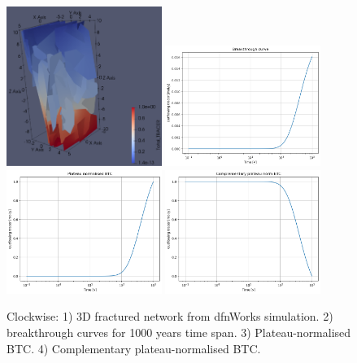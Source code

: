 \documentclass{article}
\begin{document}
\begin{figure}[htbp!]
    \centering
    \includegraphics[width=0.45\textwidth]{images/dfnWorksImages/3DdfnDiffEugV5.png}
    \hspace{0.05\textwidth}
    \includegraphics[width=0.45\textwidth]{images/dfnWorksImages/btcFrom3DeugV5.png}
    \vspace{0.05\textwidth}
    \includegraphics[width=0.45\textwidth]{images/dfnWorksImages/btcFrom3DeugV5norm.png}
    \hspace{0.05\textwidth}
    \includegraphics[width=0.45\textwidth]{images/dfnWorksImages/complementaryBtcFrom3DeugV5norm.png}
    \caption{Clockwise: 1) 3D fractured network from dfnWorks simulation. 2) breakthrough curves for 1000 years time span. 3) Plateau-normalised BTC. 4) Complementary plateau-normalised BTC.}
    \label{fig:3DdfnWorksEugV5}
\end{figure}
\end{document}
